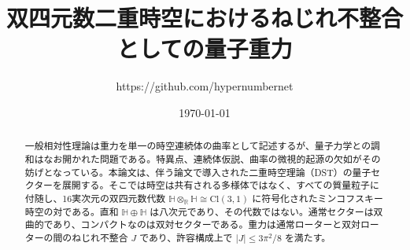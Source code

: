 \documentclass[a4paper]{article}
\title{双四元数二重時空におけるねじれ不整合としての量子重力}
\author{https://github.com/hypernumbernet}
\date{\today}
\begin{document}
\maketitle

\begin{abstract}
一般相対性理論は重力を単一の時空連続体の曲率として記述するが、量子力学との調和はなお開かれた問題である。特異点、連続体仮説、曲率の微視的起源の欠如がその妨げとなっている。本論文は、伴う論文で導入された二重時空理論（DST）の量子セクターを展開する。そこでは時空は共有される多様体ではなく、すべての質量粒子に付随し、16実次元の双四元数代数 $\mathbb{H} \otimes_{\mathbb{R}} \mathbb{H} \cong \mathrm{Cl}(3,1)$ に符号化されたミンコフスキー時空の対である。直和 $\mathbb{H}\oplus\mathbb{H}$ は八次元であり、その代数ではない。通常セクターは双曲的であり、コンパクトなのは双対セクターである。重力は通常ローターと双対ローターの間のねじれ不整合 $J$ であり、許容構成上で $|J|\le 3\pi^2/8$ を満たす。


\end{abstract}
\end{document}
